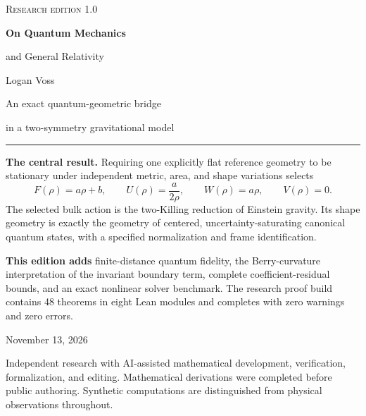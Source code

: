 \documentclass[11pt]{article}
\begin{document}
\hypersetup{pageanchor=false}
\begin{titlepage}
\vspace*{12mm}
{\color{accent}\small\scshape Research edition 1.0}\par
\vspace{10mm}
{\color{ink}\Huge\bfseries On Quantum Mechanics\par and General Relativity}\par
\vspace{9mm}
{\Large Logan Voss}\par
\vspace{9mm}
{\large An exact quantum-geometric bridge\par in a two-symmetry gravitational model}\par
\vspace{10mm}
\hrule\vspace{6mm}
\textbf{The central result.} Requiring one explicitly flat reference geometry to be stationary under independent metric, area, and shape variations selects
\[
\boxed{F(\rho)=a\rho+b,\qquad U(\rho)=\frac{a}{2\rho},\qquad
W(\rho)=a\rho,\qquad V(\rho)=0.}
\]
The selected bulk action is the two-Killing reduction of Einstein gravity. Its shape geometry is exactly the geometry of centered, uncertainty-saturating canonical quantum states, with a specified normalization and frame identification.
\par\vspace{4mm}
\textbf{This edition adds} finite-distance quantum fidelity, the Berry-curvature interpretation of the invariant boundary term, complete coefficient-residual bounds, and an exact nonlinear solver benchmark. The research proof build contains 48 theorems in eight Lean modules and completes with zero warnings and zero errors.
\vfill
{\small November 13, 2026\par
Independent research with AI-assisted mathematical development, verification, formalization, and editing. Mathematical derivations were completed before public authoring. Synthetic computations are distinguished from physical observations throughout.}\par
\end{titlepage}
\hypersetup{pageanchor=true}
\end{document}
